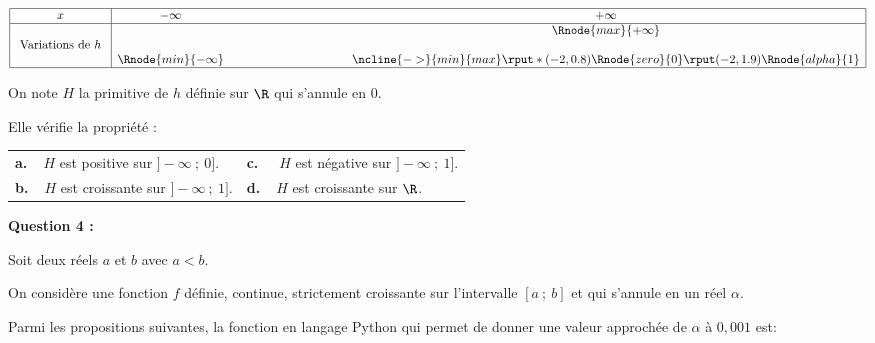 \begin{center}
{\renewcommand{\arraystretch}{1.3}
\def\esp{\hspace*{3cm}}
$\begin{array}{|c| *3{c}|}
\hline
 x & -\infty   & \esp & +\infty \\
 \hline
  &   &    & \Rnode{max}{+\infty}   \\
\text{ Variations de $h$ } & &  &  \\
 &     \Rnode{min}{-\infty} & & 
\ncline{->}{min}{max}
\rput*(-2,0.8){\Rnode{zero}{0}}
\rput(-2,1.9){\Rnode{alpha}{1}}
\\
\hline
\end{array}$
}
\end{center}

On note $H$ la primitive de $h$ définie sur $\R$ qui s'annule en $0$.

Elle vérifie la propriété :

\begin{tabularx}{\linewidth}{X X}
\textbf{a.~~}$H$ est positive sur $]-\infty~;~0]$.& \textbf{c.~~} $H$ est négative sur $]-\infty~;~1]$.\\
\textbf{b.~~}$H$ est croissante sur $]-\infty~;~1]$.& \textbf{d.~~}$H$ est croissante sur $\R$.
\end{tabularx}



\textbf{Question 4 :}

\medskip

Soit deux réels $a$ et $b$ avec $a < b$.

On considère une fonction $f$ définie, continue, strictement croissante sur l'intervalle
$[a~;~b]$ et qui s'annule en un réel $\alpha$.

Parmi les propositions suivantes, la fonction en langage Python qui permet de donner
une valeur approchée de $\alpha$ à $0,001$ est:

\smallskip

